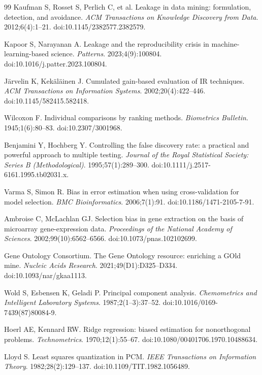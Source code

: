 \documentclass[12pt]{article}
\begin{document}
\begin{singlespace}
\begin{thebibliography}{99}
 Kaufman S, Rosset S, Perlich C, et al. Leakage in data mining: formulation, detection, and avoidance. \textit{ACM Transactions on Knowledge Discovery from Data}. 2012;6(4):1–21. doi:10.1145/2382577.2382579.

 Kapoor S, Narayanan A. Leakage and the reproducibility crisis in machine-learning-based science. \textit{Patterns}. 2023;4(9):100804. doi:10.1016/j.patter.2023.100804.

 Järvelin K, Kekäläinen J. Cumulated gain-based evaluation of IR techniques. \textit{ACM Transactions on Information Systems}. 2002;20(4):422–446. doi:10.1145/582415.582418.

 Wilcoxon F. Individual comparisons by ranking methods. \textit{Biometrics Bulletin}. 1945;1(6):80–83. doi:10.2307/3001968.

 Benjamini Y, Hochberg Y. Controlling the false discovery rate: a practical and powerful approach to multiple testing. \textit{Journal of the Royal Statistical Society: Series B (Methodological)}. 1995;57(1):289–300. doi:10.1111/j.2517-6161.1995.tb02031.x.

 Varma S, Simon R. Bias in error estimation when using cross-validation for model selection. \textit{BMC Bioinformatics}. 2006;7(1):91. doi:10.1186/1471-2105-7-91.

 Ambroise C, McLachlan GJ. Selection bias in gene extraction on the basis of microarray gene-expression data. \textit{Proceedings of the National Academy of Sciences}. 2002;99(10):6562–6566. doi:10.1073/pnas.102102699.

 Gene Ontology Consortium. The Gene Ontology resource: enriching a GOld mine. \textit{Nucleic Acids Research}. 2021;49(D1):D325–D334. doi:10.1093/nar/gkaa1113.

 Wold S, Esbensen K, Geladi P. Principal component analysis. \textit{Chemometrics and Intelligent Laboratory Systems}. 1987;2(1–3):37–52. doi:10.1016/0169-7439(87)80084-9.

 Hoerl AE, Kennard RW. Ridge regression: biased estimation for nonorthogonal problems. \textit{Technometrics}. 1970;12(1):55–67. doi:10.1080/00401706.1970.10488634.

 Lloyd S. Least squares quantization in PCM. \textit{IEEE Transactions on Information Theory}. 1982;28(2):129–137. doi:10.1109/TIT.1982.1056489.

\end{thebibliography}
\end{singlespace}
\end{document}
